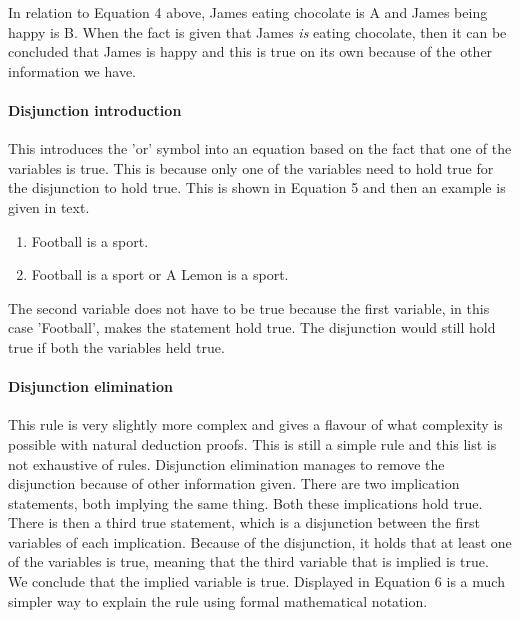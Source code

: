 \documentclass[a4paper]{article}
\begin{document}
In relation to Equation 4 above, James eating chocolate is A and James being happy is B. When the fact is given that James \textit{is} eating chocolate, then it can be concluded that James is happy and this is true on its own because of the other information we have.

\paragraph{Disjunction introduction}

This introduces the 'or' symbol into an equation based on the fact that one of the variables is true. This is because only one of the variables need to hold true for the disjunction to hold true. This is shown in Equation 5 and then an example is given in text.

\bigskip \centerline{}
\bigskip

\begin{enumerate}
\item{Football is a sport.}
\item{Football is a sport or A Lemon is a sport.}
\end{enumerate}

The second variable does not have to be true because the first variable, in this case 'Football', makes the statement hold true. The disjunction would still hold true if both the variables held true.

\paragraph{Disjunction elimination}

This rule is very slightly more complex and gives a flavour of what complexity is possible with natural deduction proofs. This is still a simple rule and this list is not exhaustive of rules. Disjunction elimination manages to remove the disjunction because of other information given. There are two implication statements, both implying the same thing. Both these implications hold true. There is then a third true statement, which is a disjunction between the first variables of each implication. Because of the disjunction, it holds that at least one of the variables is true, meaning that the third variable that is implied is true. We conclude that the implied variable is true. Displayed in Equation 6 is a much simpler way to explain the rule using formal mathematical notation.

\bigskip \centerline{}
\bigskip
\end{document}

